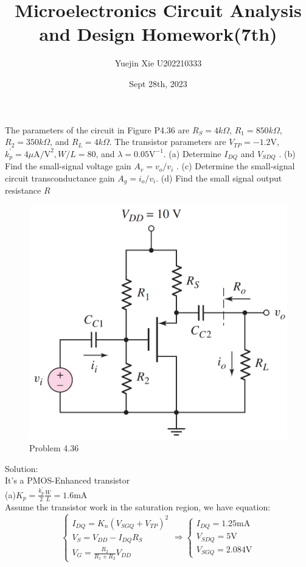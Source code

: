 \documentclass[a4paper,11pt,UTF8]{article}
\title{Microelectronics Circuit Analysis and Design Homework(7th)}
\author{Yuejin Xie \quad U202210333}
\date{Sept 28th, 2023}
\begin{document}
\maketitle
{} The parameters of the circuit in Figure P4.36 are $R_S = 4 k\Omega$, $R_1 = 850 k\Omega$,
$R_2 = 350 k\Omega$, and $R_L = 4 k\Omega$. The transistor parameters are $V_{T P} = -1.2 $V,
$k^\prime_p = 4 \mu\mathrm{A/V}^2, W/L = 80$, and $\lambda =0.05 \mathrm{V}^{-1}$. (a) Determine $I_{DQ}$ and
$V_{SDQ}$ . (b) Find the small-signal voltage gain $A_v = v_o/v_i$ . (c) Determine the small-signal circuit transconductance gain $A_g=i_o/v_i$. (d) Find the small signal output resistance $R$\\
\begin{figure}[H] 
	\centering 
	\includegraphics[scale=0.3]{MD4.36.png}
	\caption{Problem 4.36}
\end{figure}
\noindent Solution:\\
It's a PMOS-Enhanced transistor\\
(a)$\displaystyle K_p=\frac{k_p^\prime}{2}\frac{W}{L}=1.6$mA\\
Assume the transistor work in the saturation region, we have equation:
$$
\begin{cases}
	I_{DQ}=K_n(V_{SGQ}+V_{TP})^2\\
	V_S=V_{DD}-I_{DQ}R_S\\
	\displaystyle V_G=\frac{R_2}{R_1+R_2}V_{DD}
\end{cases}\Rightarrow
\begin{cases}
	I_{DQ}=1.25\mathrm{mA}\\
	V_{SDQ}=5\mathrm{V}\\
	V_{SGQ}=2.084\mathrm{V}
\end{cases}
$$
\end{document}
